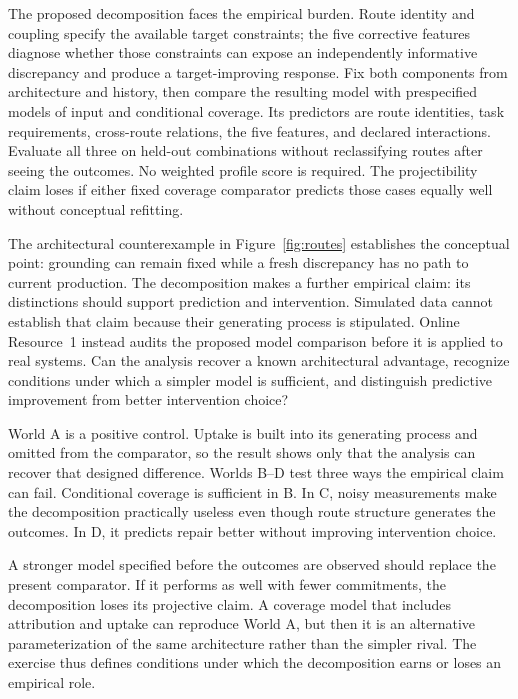 \documentclass[12pt]{article}
\begin{document}
The proposed decomposition faces the empirical burden. Route identity and coupling specify
the available target constraints; the five corrective features diagnose whether those
constraints can expose an independently informative discrepancy and produce a
target-improving response. Fix both components from architecture and history, then compare
the resulting model with prespecified models of input and conditional coverage. Its
predictors are route identities, task requirements, cross-route relations, the five features,
and declared interactions. Evaluate all three on held-out combinations without reclassifying
routes after seeing the outcomes. No weighted profile score is required. The projectibility
claim loses if either fixed coverage comparator predicts those cases equally well without
conceptual refitting.

The architectural counterexample in Figure~\ref{fig:routes} establishes the conceptual
point: grounding can remain fixed while a fresh discrepancy has no path to current
production. The decomposition makes a further empirical claim: its distinctions should
support prediction and intervention. Simulated data cannot establish that claim because
their generating process is stipulated. Online Resource~1 instead audits the proposed model
comparison before it is applied to real systems. Can the analysis recover a known
architectural advantage, recognize conditions under which a simpler model is sufficient,
and distinguish predictive improvement from better intervention choice?

World A is a positive control. Uptake is built into its generating process and omitted from
the comparator, so the result shows only that the analysis can recover that designed
difference. Worlds B--D test three ways the empirical claim can fail. Conditional coverage
is sufficient in B. In C, noisy measurements make the decomposition practically useless
even though route structure generates the outcomes. In D, it predicts repair better without
improving intervention choice.

A stronger model specified before the outcomes are observed should replace the present
comparator. If it performs as well with fewer commitments, the decomposition loses its
projective claim. A coverage model that includes attribution and uptake can reproduce World
A, but then it is an alternative parameterization of the same architecture rather than the
simpler rival. The exercise thus defines conditions under which the decomposition earns or
loses an empirical role.
\end{document}
